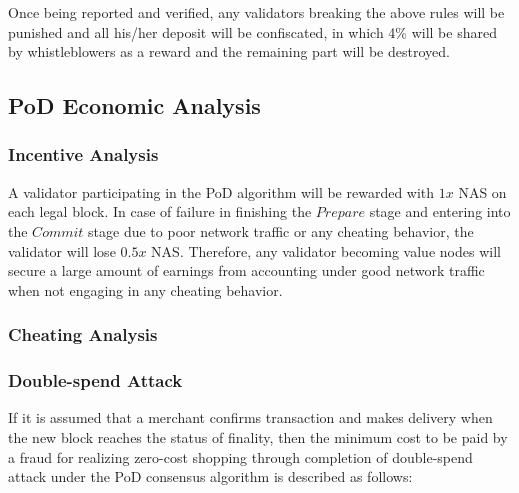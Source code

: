 Once being reported and verified, any validators breaking the above rules will be punished and all his/her deposit will be confiscated, in which 4\% will be shared by whistleblowers as a reward and the remaining part will be destroyed.

\subsection{PoD Economic Analysis}
\label{pod:economic}

\subsubsection{Incentive Analysis}
\label{pod:economic:incentive}

A validator participating in the PoD algorithm will be rewarded with $1x$ NAS on each legal block. In case of failure in finishing the $Prepare$ stage and entering into the $Commit$ stage due to poor network traffic or any cheating behavior, the validator will lose $0.5x$ NAS. Therefore, any validator becoming value nodes will secure a large amount of earnings from accounting under good network traffic when not engaging in any cheating behavior.


\subsubsection{Cheating Analysis}
\label{pod:economic:fraud}

\subsubsection*{Double-spend Attack}
\label{pod:economic:fraud:double_spend}

If it is assumed that a merchant confirms transaction and makes delivery when the new block reaches the status of finality, then the minimum cost to be paid by a fraud for realizing zero-cost shopping through completion of double-spend attack under the PoD consensus algorithm is described as follows:


